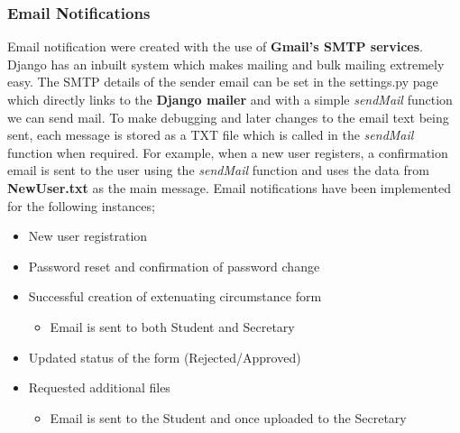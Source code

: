 \documentclass[../main.tex]{subfiles}
\begin{document}
\subsubsection{Email Notifications} 
Email notification were created with the use of \textbf{Gmail's SMTP services}. Django has an inbuilt system which makes mailing and bulk mailing extremely easy. The SMTP details of the sender email can be set in the settings.py page which directly links to the \textbf{Django mailer} and with a simple \textit{sendMail} function we can send mail. To make debugging and later changes to the email text being sent, each message is stored as a TXT file which is called in the \textit{sendMail} function when required. For example, when a new user registers, a confirmation email is sent to the user using the \textit{sendMail} function and uses the data from \textbf{NewUser.txt} as the main message. Email notifications have been implemented for the following instances;

\begin{itemize}
  \item New user registration
  \item Password reset and confirmation of password change
  \item Successful creation of extenuating circumstance form
  	\begin{itemize}
     \item Email is sent to both Student and Secretary
    \end{itemize}
  \item Updated status of the form (Rejected/Approved)
  \item Requested additional files
  	\begin{itemize}
     \item Email is sent to the Student and once uploaded to the Secretary
    	\end{itemize} 
\end{itemize}
\end{document}
